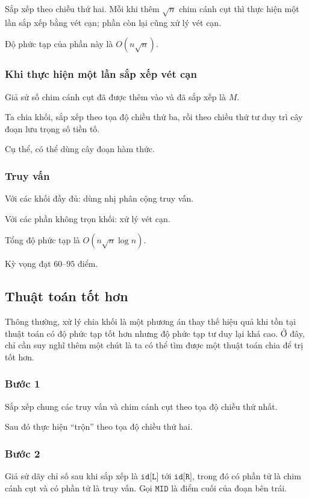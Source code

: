 \documentclass[11pt]{article}
\begin{document}
Sắp xếp theo chiều thứ hai. Mỗi khi thêm \(\sqrt n\) chim cánh cụt thì thực
hiện một lần sắp xếp bằng vét cạn; phần còn lại cũng xử lý vét cạn.

Độ phức tạp của phần này là \(O(n\sqrt n)\).

\subsubsection{Khi thực hiện một lần sắp xếp vét cạn}

Giả sử số chim cánh cụt đã được thêm vào và đã sắp xếp là \(M\).

Ta chia khối, sắp xếp theo tọa độ chiều thứ ba, rồi theo chiều thứ tư duy trì
cây đoạn lưu trọng số tiền tố.

Cụ thể, có thể dùng cây đoạn hàm thức.

\subsubsection{Truy vấn}

Với các khối đầy đủ: dùng nhị phân cộng truy vấn.

Với các phần không trọn khối: xử lý vét cạn.

Tổng độ phức tạp là \(O(n\sqrt n\log n)\).

Kỳ vọng đạt \(60\)--\(95\) điểm.

\subsection{Thuật toán tốt hơn}

Thông thường, xử lý chia khối là một phương án thay thế hiệu quả khi tồn tại
thuật toán có độ phức tạp tốt hơn nhưng độ phức tạp tư duy lại khá cao. Ở
đây, chỉ cần suy nghĩ thêm một chút là ta có thể tìm được một thuật toán chia
để trị tốt hơn.

\subsubsection{Bước 1}

Sắp xếp chung các truy vấn và chim cánh cụt theo tọa độ chiều thứ nhất.

Sau đó thực hiện ``trộn'' theo tọa độ chiều thứ hai.

\subsubsection{Bước 2}

Giả sử dãy chỉ số sau khi sắp xếp là \(\texttt{id[L]}\) tới
\(\texttt{id[R]}\), trong đó có phần tử là chim cánh cụt và có phần tử là
truy vấn. Gọi \(\texttt{MID}\) là điểm cuối của đoạn bên trái.
\end{document}
